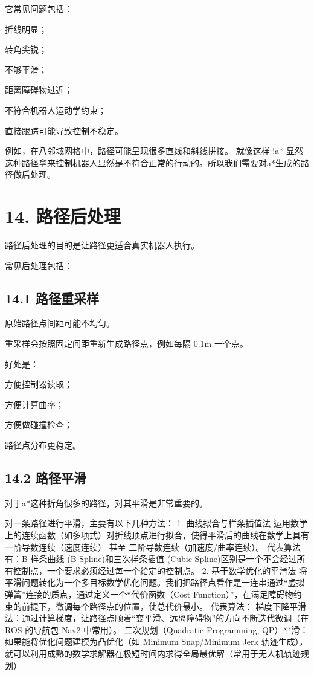 \documentclass[a4paper,12pt]{book}
\begin{document}
{它常见问题包括：

\item 折线明显；
\item 转角尖锐；
\item 不够平滑；
\item 距离障碍物过近；
\item 不符合机器人运动学约束；
\item 直接跟踪可能导致控制不稳定。

例如，在八邻域网格中，路径可能呈现很多直线和斜线拼接。
就像这样
!\href{picture/astar.png}{a*}
显然这种路径拿来控制机器人显然是不符合正常的行动的。所以我们需要对a*生成的路径做后处理。



\section{14. 路径后处理}

路径后处理的目的是让路径更适合真实机器人执行。

常见后处理包括：

\subsection{14.1 路径重采样}

原始路径点间距可能不均匀。

重采样会按照固定间距重新生成路径点，例如每隔 0.1m 一个点。

好处是：

\item 方便控制器读取；
\item 方便计算曲率；
\item 方便做碰撞检查；
\item 路径点分布更稳定。

\subsection{14.2 路径平滑}

对于a*这种折角很多的路径，对其平滑是非常重要的。

对一条路径进行平滑，主要有以下几种方法：
1. 曲线拟合与样条插值法
运用数学上的连续函数（如多项式）对折线顶点进行拟合，使得平滑后的曲线在数学上具有 一阶导数连续（速度连续） 甚至 二阶导数连续（加速度/曲率连续）。
    代表算法有：B 样条曲线 (B-Spline)和三次样条插值 (Cubic Spline)区别是一个不会经过所有控制点，一个要求必须经过每一个给定的控制点。
2. 基于数学优化的平滑法
将平滑问题转化为一个多目标数学优化问题。我们把路径点看作是一连串通过“虚拟弹簧”连接的质点，通过定义一个“代价函数（Cost Function）”，在满足障碍物约束的前提下，微调每个路径点的位置，使总代价最小。
代表算法：
    梯度下降平滑法：通过计算梯度，让路径点顺着“变平滑、远离障碍物”的方向不断迭代微调（在 ROS 的导航包 Nav2 中常用）。
    二次规划（Quadratic Programming, QP）平滑：如果能将优化问题建模为凸优化（如 Minimum Snap/Minimum Jerk 轨迹生成），就可以利用成熟的数学求解器在极短时间内求得全局最优解（常用于无人机轨迹规划）

}
\end{document}
